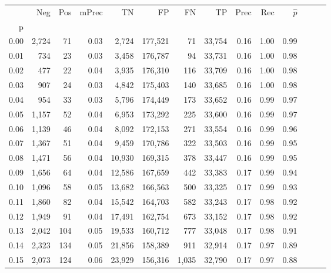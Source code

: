 \begin{tabular}{rrrrrrrrrrrrrr}
\toprule
{} &    Neg &  Pos & mPrec &       TN &       FP &      FN &      TP &  Prec &   Rec & $\hat{p}$ \\
p    &        &      &       &          &          &         &         &       &       &           \\
\midrule
0.00 &  2,724 &   71 &  0.03 &    2,724 &  177,521 &      71 &  33,754 &  0.16 &  1.00 &      0.99 \\
0.01 &    734 &   23 &  0.03 &    3,458 &  176,787 &      94 &  33,731 &  0.16 &  1.00 &      0.98 \\
0.02 &    477 &   22 &  0.04 &    3,935 &  176,310 &     116 &  33,709 &  0.16 &  1.00 &      0.98 \\
0.03 &    907 &   24 &  0.03 &    4,842 &  175,403 &     140 &  33,685 &  0.16 &  1.00 &      0.98 \\
0.04 &    954 &   33 &  0.03 &    5,796 &  174,449 &     173 &  33,652 &  0.16 &  0.99 &      0.97 \\
0.05 &  1,157 &   52 &  0.04 &    6,953 &  173,292 &     225 &  33,600 &  0.16 &  0.99 &      0.97 \\
0.06 &  1,139 &   46 &  0.04 &    8,092 &  172,153 &     271 &  33,554 &  0.16 &  0.99 &      0.96 \\
0.07 &  1,367 &   51 &  0.04 &    9,459 &  170,786 &     322 &  33,503 &  0.16 &  0.99 &      0.95 \\
0.08 &  1,471 &   56 &  0.04 &   10,930 &  169,315 &     378 &  33,447 &  0.16 &  0.99 &      0.95 \\
0.09 &  1,656 &   64 &  0.04 &   12,586 &  167,659 &     442 &  33,383 &  0.17 &  0.99 &      0.94 \\
0.10 &  1,096 &   58 &  0.05 &   13,682 &  166,563 &     500 &  33,325 &  0.17 &  0.99 &      0.93 \\
0.11 &  1,860 &   82 &  0.04 &   15,542 &  164,703 &     582 &  33,243 &  0.17 &  0.98 &      0.92 \\
0.12 &  1,949 &   91 &  0.04 &   17,491 &  162,754 &     673 &  33,152 &  0.17 &  0.98 &      0.92 \\
0.13 &  2,042 &  104 &  0.05 &   19,533 &  160,712 &     777 &  33,048 &  0.17 &  0.98 &      0.91 \\
0.14 &  2,323 &  134 &  0.05 &   21,856 &  158,389 &     911 &  32,914 &  0.17 &  0.97 &      0.89 \\
0.15 &  2,073 &  124 &  0.06 &   23,929 &  156,316 &   1,035 &  32,790 &  0.17 &  0.97 &      0.88 \\

\end{tabular}
